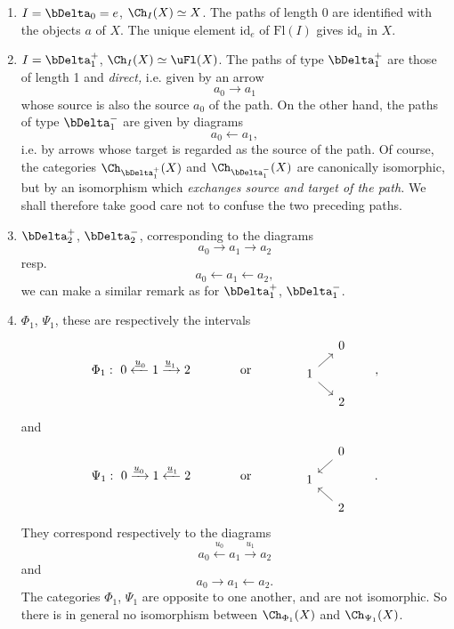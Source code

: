 \begin{enumerate}
\item[1.] $I = \bDelta_0 = e$, $\Ch_I(X) \simeq X$. The paths of length 0 are identified with the objects $a$ of $X$. The unique element $\mathrm{id}_e$ of $\mathrm{Fl}(I)$ gives $\mathrm{id}_a$ in $X$.

\item[2.] $I = \bDelta_1^+$, $\Ch_I(X) \simeq \uFl(X)$. The paths of type $\bDelta_1^+$ are those of length 1 and \textit{direct,} i.e. given by an arrow
\[
a_0 \longrightarrow a_1
\]
whose source is also the source $a_0$ of the path. On the other hand, the paths of type $\bDelta_1^-$ are given by diagrams
\[
a_0 \longleftarrow a_1,
\]
i.e. by arrows whose target is regarded as the source of the path. Of course, the categories $\Ch_{\bDelta_1^+}(X)$ and $\Ch_{\bDelta_1^-}(X)$ are canonically isomorphic, but by an isomorphism which \textit{exchanges source and target of the path.} We shall therefore take good care not to confuse the two preceding paths.


\item[3.] $\bDelta_2^+$, $\bDelta_2^-$, corresponding to the diagrams
\[
a_0 \longrightarrow a_1 \longrightarrow a_2
\]
resp.
\[
a_0 \longleftarrow a_1 \longleftarrow a_2,
\]
we can make a similar remark as for $\bDelta_1^+$, $\bDelta_1^-$.


\item[4.] $\Phi_1$, $\Psi_1$, these are respectively the intervals
\[
\Phi_1 :\ 0 \xleftarrow{\underline{u}_0} 1 \xrightarrow{\underline{u}_1} 2 \qquad\qquad \text{or} \qquad\qquad
\begin{tikzcd}[row sep=small, column sep=small]
 & 0 \\
1 \arrow[ur] \arrow[dr] & \\
 & 2
\end{tikzcd}
\qquad , %
\]
and
\[
\Psi_1 :\ 0 \xrightarrow{\underline{u}_0} 1 \xleftarrow{\underline{u}_1} 2 \qquad\qquad \text{or} \qquad\qquad
\begin{tikzcd}[row sep=small, column sep=small]
 & 0 \arrow[dl] \\
1 & \\
 & 2 \arrow[ul]
\end{tikzcd}
\qquad .
\]
They correspond respectively to the diagrams
\[
a_0 \xleftarrow{u_0} a_1 \xrightarrow{u_1} a_2
\]
and
\[
a_0 \longrightarrow a_1 \longleftarrow a_2.
\]
The categories $\Phi_1$, $\Psi_1$ are opposite to one another, and are not isomorphic. So there is in general no isomorphism between $\Ch_{\Phi_1}(X)$ and $\Ch_{\Psi_1}(X)$.
\end{enumerate}


